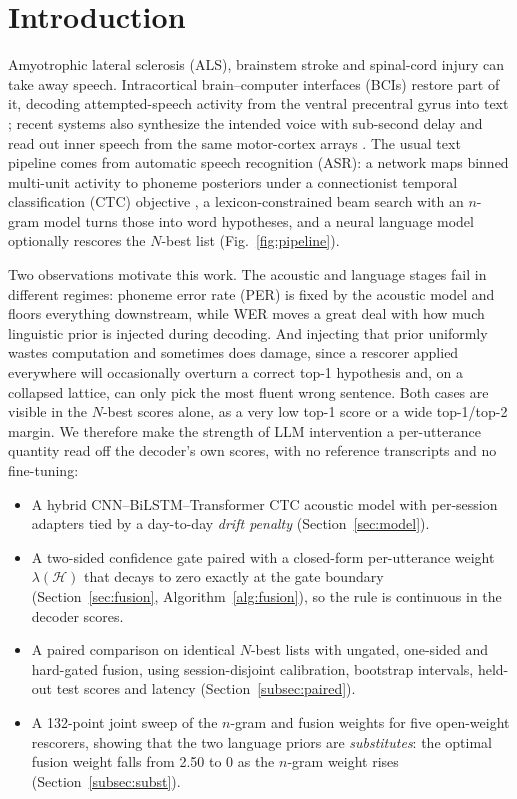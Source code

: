 \documentclass[conference,a4paper,10pt]{IEEEtran}
\begin{document}
\section{Introduction}
Amyotrophic lateral sclerosis (ALS), brainstem stroke and spinal-cord injury can
take away speech. Intracortical brain--computer interfaces (BCIs) restore part of
it, decoding attempted-speech
activity from the ventral precentral gyrus into text
\cite{willett2023speech,card2024accurate,metzger2023avatar}; recent systems also
synthesize the intended voice with sub-second delay \cite{wairagkar2025voice,littlejohn2025streaming}
and read out inner speech from the same motor-cortex arrays \cite{kunz2025inner}.
The usual text pipeline comes from automatic speech recognition (ASR): a network
maps binned multi-unit activity to phoneme posteriors under a connectionist
temporal classification (CTC) objective \cite{graves2006ctc}, a
lexicon-constrained beam search with an $n$-gram model turns those into word
hypotheses, and a neural language model optionally rescores the $N$-best list
(Fig.~\ref{fig:pipeline}).

Two observations motivate this work. The acoustic and language stages fail in
different regimes: phoneme error rate (PER) is fixed by the acoustic model and
floors everything downstream, while WER moves a great deal with how much
linguistic prior is injected during decoding. And injecting that prior uniformly
wastes computation and sometimes does damage, since a rescorer applied everywhere
will occasionally overturn a correct top-1 hypothesis and, on a collapsed
lattice, can only pick the most fluent wrong sentence. Both cases are visible in
the $N$-best scores alone, as a very low top-1 score or a wide top-1/top-2
margin. We therefore make the strength of LLM intervention a per-utterance
quantity read off the decoder's own scores, with no reference transcripts and no
fine-tuning:

\begin{itemize}
\item A hybrid CNN--BiLSTM--Transformer CTC acoustic model with per-session
adapters tied by a day-to-day \emph{drift penalty} (Section~\ref{sec:model}).
\item A two-sided confidence gate paired with a closed-form per-utterance weight
$\lambda(\mathcal{H})$ that decays to zero exactly at the gate boundary
(Section~\ref{sec:fusion}, Algorithm~\ref{alg:fusion}), so the rule is
continuous in the decoder scores.
\item A paired comparison on identical $N$-best lists with ungated, one-sided
and hard-gated fusion, using session-disjoint calibration, bootstrap intervals,
held-out test scores and latency (Section~\ref{subsec:paired}).
\item A 132-point joint sweep of the $n$-gram and fusion weights for five
open-weight rescorers, showing that the two language priors are
\emph{substitutes}: the optimal fusion weight falls from 2.50 to 0 as the
$n$-gram weight rises (Section~\ref{subsec:subst}).
\end{itemize}
\end{document}
